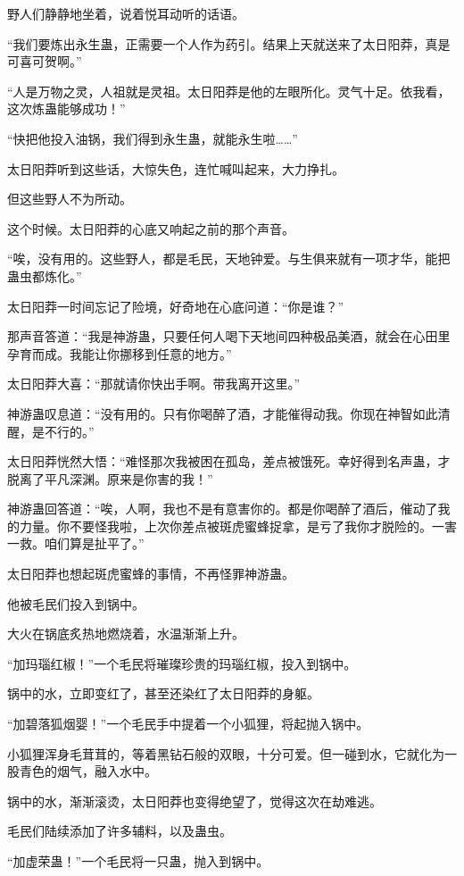 \begin{this_body}
野人们静静地坐着，说着悦耳动听的话语。

“我们要炼出永生蛊，正需要一个人作为药引。结果上天就送来了太日阳莽，真是可喜可贺啊。”

“人是万物之灵，人祖就是灵祖。太日阳莽是他的左眼所化。灵气十足。依我看，这次炼蛊能够成功！”

“快把他投入油锅，我们得到永生蛊，就能永生啦……”

太日阳莽听到这些话，大惊失色，连忙喊叫起来，大力挣扎。

但这些野人不为所动。

这个时候。太日阳莽的心底又响起之前的那个声音。

“唉，没有用的。这些野人，都是毛民，天地钟爱。与生俱来就有一项才华，能把蛊虫都炼化。”

太日阳莽一时间忘记了险境，好奇地在心底问道：“你是谁？”

那声音答道：“我是神游蛊，只要任何人喝下天地间四种极品美酒，就会在心田里孕育而成。我能让你挪移到任意的地方。”

太日阳莽大喜：“那就请你快出手啊。带我离开这里。”

神游蛊叹息道：“没有用的。只有你喝醉了酒，才能催得动我。你现在神智如此清醒，是不行的。”

太日阳莽恍然大悟：“难怪那次我被困在孤岛，差点被饿死。幸好得到名声蛊，才脱离了平凡深渊。原来是你害的我！”

神游蛊回答道：“唉，人啊，我也不是有意害你的。都是你喝醉了酒后，催动了我的力量。你不要怪我啦，上次你差点被斑虎蜜蜂捉拿，是亏了我你才脱险的。一害一救。咱们算是扯平了。”

太日阳莽也想起斑虎蜜蜂的事情，不再怪罪神游蛊。

他被毛民们投入到锅中。

大火在锅底炙热地燃烧着，水温渐渐上升。

“加玛瑙红椒！”一个毛民将璀璨珍贵的玛瑙红椒，投入到锅中。

锅中的水，立即变红了，甚至还染红了太日阳莽的身躯。

“加碧落狐烟婴！”一个毛民手中提着一个小狐狸，将起抛入锅中。

小狐狸浑身毛茸茸的，等着黑钻石般的双眼，十分可爱。但一碰到水，它就化为一股青色的烟气，融入水中。

锅中的水，渐渐滚烫，太日阳莽也变得绝望了，觉得这次在劫难逃。

毛民们陆续添加了许多辅料，以及蛊虫。

“加虚荣蛊！”一个毛民将一只蛊，抛入到锅中。


\end{this_body}
